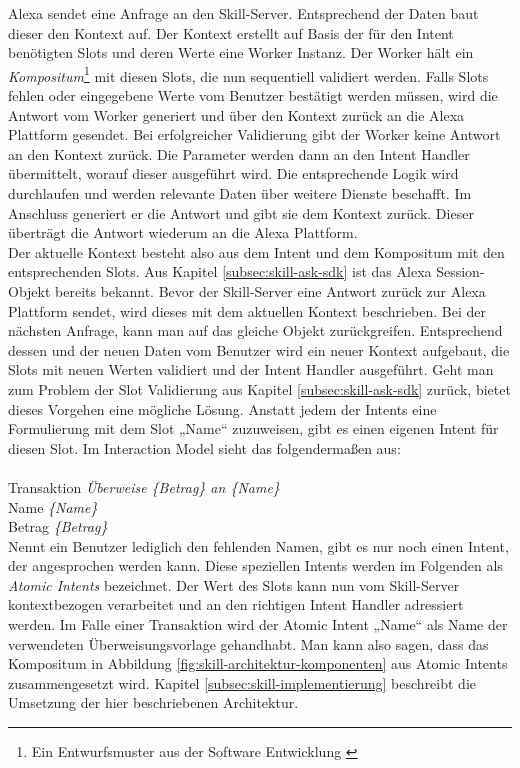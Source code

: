 Alexa sendet eine Anfrage an den Skill-Server. Entsprechend der Daten baut dieser den Kontext auf. Der Kontext erstellt auf Basis der für den Intent benötigten Slots und deren Werte eine Worker Instanz. Der Worker hält ein \textit{Kompositum}\footnote{Ein Entwurfsmuster aus der Software Entwicklung \cite{freeman-headfirst-patterns}} mit diesen Slots, die nun sequentiell validiert werden. Falls Slots fehlen oder eingegebene Werte vom Benutzer bestätigt werden müssen, wird die Antwort vom Worker generiert und über den Kontext zurück an die Alexa Plattform gesendet. Bei erfolgreicher Validierung gibt der Worker keine Antwort an den Kontext zurück. Die Parameter werden dann an den Intent Handler übermittelt, worauf dieser ausgeführt wird. Die entsprechende Logik wird durchlaufen und \ggf werden relevante Daten über weitere Dienste beschafft. Im Anschluss generiert er die Antwort und gibt sie dem Kontext zurück. Dieser überträgt die Antwort wiederum an die Alexa Plattform.\\
Der aktuelle Kontext besteht also aus dem Intent und dem Kompositum mit den entsprechenden Slots. Aus Kapitel \ref{subsec:skill-ask-sdk} ist das Alexa Session-Objekt bereits bekannt. Bevor der Skill-Server eine Antwort zurück zur Alexa Plattform sendet, wird dieses mit dem aktuellen Kontext beschrieben. Bei der nächsten Anfrage, kann man auf das gleiche Objekt zurückgreifen. Entsprechend dessen und der neuen Daten vom Benutzer wird ein neuer Kontext aufgebaut, die Slots mit \ggf neuen Werten validiert und der Intent Handler ausgeführt. Geht man zum Problem der Slot Validierung aus Kapitel \ref{subsec:skill-ask-sdk} zurück, bietet dieses Vorgehen eine mögliche Lösung. Anstatt jedem der Intents eine Formulierung mit dem Slot „Name“ zuzuweisen, gibt es einen eigenen Intent für diesen Slot. Im Interaction Model sieht das folgendermaßen aus: \\\\
Transaktion \textit{Überweise \{Betrag\} an \{Name\}}\\
Name \textit{\{Name\}}\\
Betrag \textit{\{Betrag\}}\\

Nennt ein Benutzer lediglich den fehlenden Namen, gibt es nur noch einen Intent, der angesprochen werden kann. Diese speziellen Intents werden im Folgenden als \textit{Atomic Intents} bezeichnet. Der Wert des Slots kann nun vom Skill-Server kontextbezogen verarbeitet und an den richtigen Intent Handler adressiert werden. Im Falle einer Transaktion wird der Atomic Intent „Name“ als Name der verwendeten Überweisungsvorlage gehandhabt. Man kann also sagen, dass das Kompositum in Abbildung \ref{fig:skill-architektur-komponenten} aus Atomic Intents zusammengesetzt wird. Kapitel \ref{subsec:skill-implementierung} beschreibt die Umsetzung der hier beschriebenen Architektur. 

